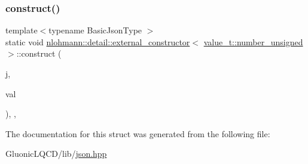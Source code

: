 \subsubsection{\texorpdfstring{construct()}{construct()}}
{\footnotesize\ttfamily template$<$typename Basic\+Json\+Type $>$ \\
static void \mbox{\hyperlink{structnlohmann_1_1detail_1_1external__constructor}{nlohmann\+::detail\+::external\+\_\+constructor}}$<$ \mbox{\hyperlink{namespacenlohmann_1_1detail_a90aa5ef615aa8305e9ea20d8a947980fadce7cc8ec29055c4158828921f2f265e}{value\+\_\+t\+::number\+\_\+unsigned}} $>$\+::construct (\begin{DoxyParamCaption}\item[{Basic\+Json\+Type \&}]{j,  }\item[{typename Basic\+Json\+Type\+::number\+\_\+unsigned\+\_\+t}]{val }\end{DoxyParamCaption})\hspace{0.3cm}{\ttfamily [inline]}, {\ttfamily [static]}, {\ttfamily [noexcept]}}



The documentation for this struct was generated from the following file\+:\begin{DoxyCompactItemize}
\item 
Gluonic\+L\+Q\+C\+D/lib/\mbox{\hyperlink{json_8hpp}{json.\+hpp}}\end{DoxyCompactItemize}

